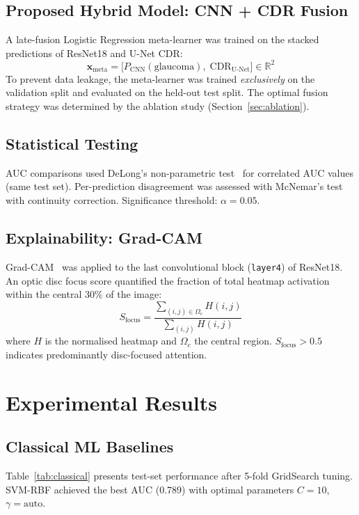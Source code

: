 \documentclass[conference]{IEEEtran}
\begin{document}
\subsection{Proposed Hybrid Model: CNN + CDR Fusion}
A late-fusion Logistic Regression meta-learner was trained on the
stacked predictions of ResNet18 and U-Net CDR:
\begin{equation}
  \mathbf{x}_{\text{meta}} =
  \bigl[P_{\text{CNN}}(\text{glaucoma}),\;
  \text{CDR}_{\text{U-Net}}\bigr] \in \mathbb{R}^{2}
  \label{eq:meta}
\end{equation}
To prevent data leakage, the meta-learner was trained
\textit{exclusively} on the validation split and evaluated on the
held-out test split. The optimal fusion strategy was determined by
the ablation study (Section~\ref{sec:ablation}).
 
\subsection{Statistical Testing}
AUC comparisons used DeLong's non-parametric test~\cite{delong1988}
for correlated AUC values (same test set). Per-prediction
disagreement was assessed with McNemar's test with continuity
correction. Significance threshold: $\alpha = 0.05$.
 
\subsection{Explainability: Grad-CAM}
Grad-CAM~\cite{selvaraju2017} was applied to the last
convolutional block (\texttt{layer4}) of ResNet18. An optic disc
focus score quantified the fraction of total heatmap activation
within the central 30\% of the image:
\begin{equation}
  S_{\text{focus}} =
  \frac{\displaystyle\sum_{(i,j)\in\Omega_c} H(i,j)}
       {\displaystyle\sum_{(i,j)} H(i,j)}
  \label{eq:focus}
\end{equation}
where $H$ is the normalised heatmap and $\Omega_c$ the central
region. $S_{\text{focus}} > 0.5$ indicates predominantly
disc-focused attention.
 
\section{Experimental Results}
 
\subsection{Classical ML Baselines}
Table~\ref{tab:classical} presents test-set performance after
5-fold GridSearch tuning. SVM-RBF achieved the best AUC (0.789)
with optimal parameters $C\!=\!10$, $\gamma\!=\!\text{auto}$.
 
\end{document}
